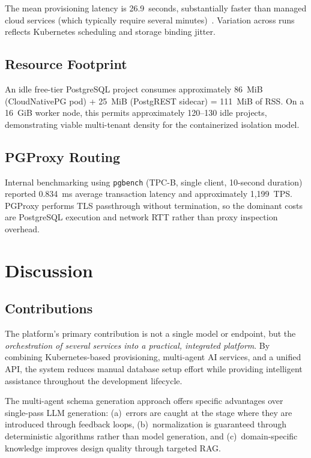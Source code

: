 \documentclass[twoside,twocolumn,10pt]{article}
\begin{document}
The mean provisioning latency is 26.9~seconds, substantially faster than managed cloud services (which typically require several minutes)~\cite{aws_rds_provisioning}. Variation across runs reflects Kubernetes scheduling and storage binding jitter.

\subsection{Resource Footprint}

An idle free-tier PostgreSQL project consumes approximately 86~MiB (CloudNativePG pod) + 25~MiB (PostgREST sidecar) = 111~MiB of RSS. On a 16~GiB worker node, this permits approximately 120--130 idle projects, demonstrating viable multi-tenant density for the containerized isolation model.

\subsection{PGProxy Routing}

Internal benchmarking using \texttt{pgbench} (TPC-B, single client, 10-second duration) reported 0.834~ms average transaction latency and approximately 1,199~TPS. PGProxy performs TLS passthrough without termination, so the dominant costs are PostgreSQL execution and network RTT rather than proxy inspection overhead.


\section{Discussion}
\fontsize{11}{13}\selectfont

\subsection{Contributions}

The platform's primary contribution is not a single model or endpoint, but the \textit{orchestration of several services into a practical, integrated platform}. By combining Kubernetes-based provisioning, multi-agent AI services, and a unified API, the system reduces manual database setup effort while providing intelligent assistance throughout the development lifecycle.

The multi-agent schema generation approach offers specific advantages over single-pass LLM generation: (a)~errors are caught at the stage where they are introduced through feedback loops, (b)~normalization is guaranteed through deterministic algorithms rather than model generation, and (c)~domain-specific knowledge improves design quality through targeted RAG.
\end{document}
